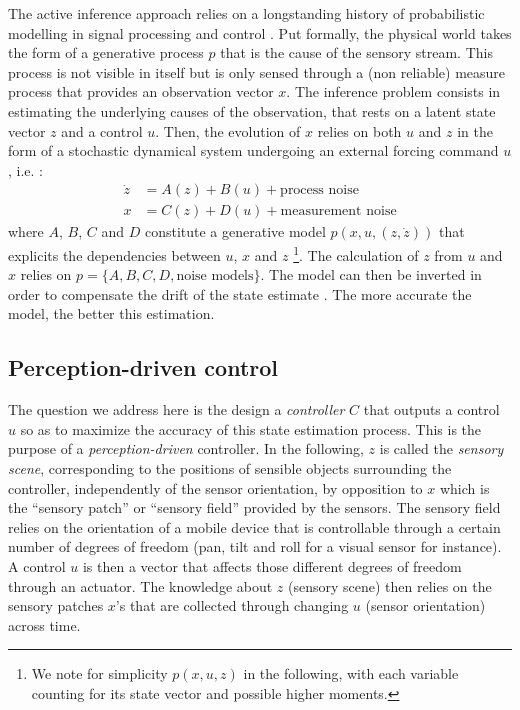 \documentclass[12pt,twoside,openright]{article}
\begin{document}
	The active inference approach relies on a longstanding history of probabilistic modelling in signal processing and control \cite{Kalman1960,Baum1966,friston1994statistical}.  Put formally, the physical world  takes the form of a generative process $p$ that is the cause of the sensory stream. This process is not visible in itself but is only sensed through a (non reliable) measure process that provides an observation vector $x$. The inference problem consists in estimating the underlying causes of the observation, that rests on a latent state vector $z$ and a control $u$.  Then, the evolution of $x$ relies on both $u$ and $z$ in the form of a stochastic dynamical system undergoing an external forcing command $u$, i.e. :
	\begin{align}
	  \dot{z} &= A(z) + B(u) + \text{process noise}\label{eq:kalman-process}\\
	  x &= C(z) + D(u) + \text{measurement noise} \label{eq:kalman-measure}
	\end{align}  
	where $A$, $B$, $C$ and $D$ constitute a generative model $p(x,u,(z,\dot{z}))$ that explicits the dependencies between $u$, $x$ and $z$ \footnote{We note for simplicity $p(x,u,z)$ in the following, with each variable counting for its state vector and possible higher moments.}. 
	The calculation of $z$ from $u$ and $x$ relies on $p = \{A,B,C,D,\text{noise models}\}$. The model can then be inverted in order to compensate the drift of the state estimate \cite{Kalman1960,Baum1966}. The more accurate the model, the better this estimation. 
	
	\subsection{Perception-driven control}
	The question we address here is the design a \emph{controller} $C$ that outputs a control $u$ so as to maximize the accuracy of this state estimation process. This is the purpose of a \emph{perception-driven} controller.
	In the following, $z$ is called the \emph{sensory scene}, corresponding to the positions of sensible objects surrounding the controller, independently of the sensor orientation, by opposition to $x$ which is the ``sensory patch'' or ``sensory field'' provided by the sensors. {\color{blue} The sensory field relies on the orientation of a mobile device that is controllable through a certain number of degrees of freedom (pan, tilt and roll for a visual sensor for instance). A control $u$ is then a vector that affects those different degrees of freedom through an actuator.} The knowledge about $z$ (sensory scene) then relies on the sensory patches $x$'s that are collected through changing $u$ (sensor orientation) across time. 
	
\end{document}
